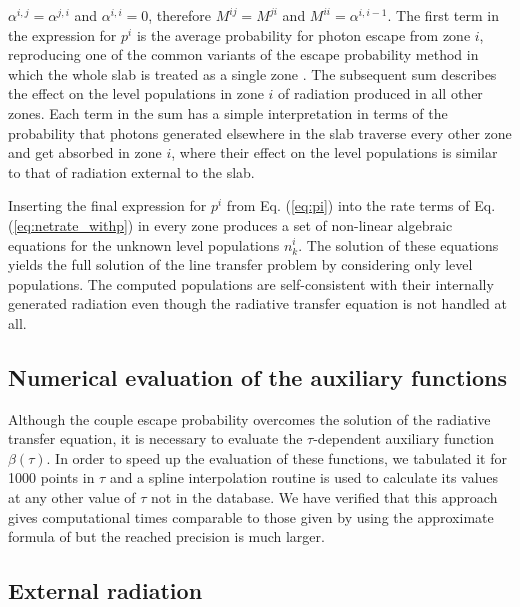 \documentclass[12pt]{article}
\def\a(#1){\alpha^{#1}}
\begin{document}
$\a(i,j) = \a(j,i)$ and $\a(i,i) = 0$, therefore $M^{ij} = M^{ji}$ and $M^{ii}
= \a(i,i-1)$. The
first term in the expression for $p^i$ is the average probability for photon
escape from zone $i$, reproducing one of the common variants of the escape
probability method in which the whole slab is treated as a single zone
\cite[e.g.,][]{krolik_mckee78}. The subsequent sum describes the effect on the level
populations in zone $i$ of radiation produced in all other zones. Each term in
the sum has a simple interpretation in terms of the probability that photons
generated elsewhere in the slab traverse every other zone and get absorbed in
zone $i$, where their effect on the level populations is similar to that of
radiation external to the slab.

Inserting the final expression for $p^i$ from Eq. (\ref{eq:pi}) into the rate terms
of Eq. (\ref{eq:netrate_withp}) in every zone produces a set of non-linear algebraic
equations for the unknown level populations $n_k^i$. The solution of these equations
yields the full solution of the line transfer problem by considering only level
populations. The computed populations are self-consistent with their internally
generated radiation even though the radiative transfer equation is not handled
at all.

\subsection{Numerical evaluation of the auxiliary functions}

Although the couple escape probability overcomes the solution of the radiative
transfer equation, it is necessary to evaluate the $\tau$-dependent auxiliary
function $\beta(\tau)$. In order to speed up the evaluation of these functions,
we tabulated it for 1000 points in $\tau$ and a spline interpolation routine is
used to calculate its values at any other value of $\tau$ not in the database.
We have verified that this approach gives computational times comparable to
those given by using the approximate formula of \cite{krolik_mckee78} but the
reached precision is much larger.


\subsection{External radiation}
\end{document}

